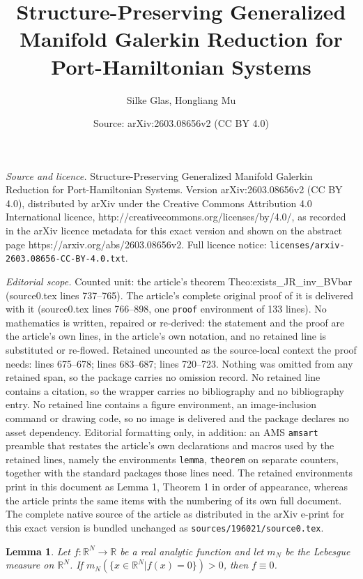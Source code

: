 \documentclass[10pt,a4paper]{amsart}
\title{Structure-Preserving Generalized Manifold Galerkin Reduction for Port-Hamiltonian Systems}
\author{Silke Glas, Hongliang Mu}
\date{Source: arXiv:2603.08656v2 (CC BY 4.0)}
\newtheorem{lemma}{Lemma}
\newcommand{\FOMsize}{N}
\newcommand{\R}{\mathbb{R}}
\begin{document}
\maketitle

\noindent\emph{Source and licence.} Structure-Preserving Generalized Manifold Galerkin Reduction for Port-Hamiltonian Systems. Version arXiv:2603.08656v2 (CC BY 4.0), distributed by arXiv under the Creative Commons Attribution 4.0 International licence, http://creativecommons.org/licenses/by/4.0/, as recorded in the arXiv licence metadata for this exact version and shown on the abstract page https://arxiv.org/abs/2603.08656v2. Full licence notice: \texttt{licenses/arxiv-2603.08656-CC-BY-4.0.txt}.\par\smallskip

\noindent\textit{Editorial scope.} Counted unit: the article's theorem Theo:exists\_JR\_inv\_BVbar (source0.tex lines 737--765). The article's complete original proof of it is delivered with it (source0.tex lines 766--898, one \texttt{proof} environment of 133 lines). No mathematics is written, repaired or re-derived: the statement and the proof are the article's own lines, in the article's own notation, and no retained line is substituted or re-flowed.  Retained uncounted as the source-local context the proof needs: lines 675--678; lines 683--687; lines 720--723.  Nothing was omitted from any retained span, so the package carries no omission record.  No retained line contains a citation, so the wrapper carries no bibliography and no bibliography entry.  No retained line contains a figure environment, an image-inclusion command or drawing code, so no image is delivered and the package declares no asset dependency.  Editorial formatting only, in addition: an AMS \texttt{amsart} preamble that restates the article's own declarations and macros used by the retained lines, namely the environments \texttt{lemma}, \texttt{theorem} on separate counters, together with the standard packages those lines need.  The retained environments print in this document as Lemma 1, Theorem 1 in order of appearance, whereas the article prints the same items with the numbering of its own full document.  The complete native source of the article as distributed in the arXiv e-print for this exact version is bundled unchanged as \texttt{sources/196021/source0.tex}.
 \begin{lemma}
		\label{lemma:analytic_measure}
		Let $f:\R^{\FOMsize}\rightarrow\R$ be a real analytic function and let $m_{\FOMsize}$ be the Lebesgue measure on $\R^{\FOMsize}$. If $m_{\FOMsize}(\{x\in\R^{\FOMsize}| f(x)=0\})>0$, then $f\equiv0$.
	\end{lemma}
\end{document}
